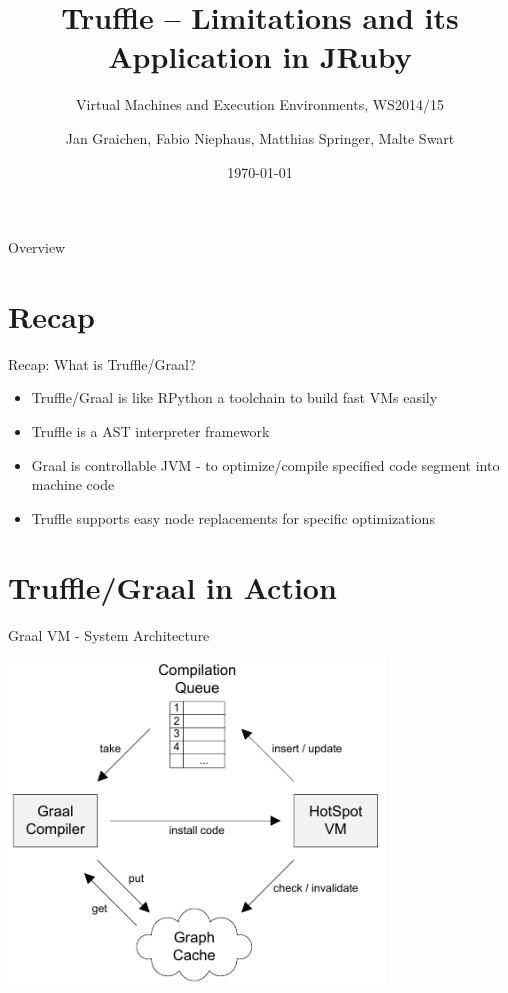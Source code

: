\documentclass[xcolor=dvipsname,handout]{beamer} %
\title{Truffle -- Limitations and its Application in JRuby}
\subtitle{Virtual Machines and Execution Environments, WS2014/15}
\author{Jan Graichen, Fabio Niephaus, Matthias Springer, Malte Swart}
\date{\today}
\institute[2012]{Hasso Plattner Institute, Software Architecture Group}
\begin{document}
\begin{frame}[plain]
	\maketitle
\end{frame}
\begin{frame}{Overview}
	\tableofcontents[hideallsubsections]
\end{frame}


\section{Recap}

\begin{frame}{Recap: What is Truffle/Graal?}
\begin{itemize}
    \item Truffle/Graal is like RPython a toolchain to build fast VMs easily
    \item Truffle is a AST interpreter framework
    \item Graal is controllable JVM - to optimize/compile specified code segment into machine code
    \item Truffle supports easy node replacements for specific optimizations
\end{itemize}
\end{frame}


\section{Truffle/Graal in Action}

\begin{frame}{Graal VM - System Architecture}
\begin{table}
    \centering
    \includegraphics[width=0.75\textwidth]{graal_architecture.pdf}
\end{table}
\end{frame}
\end{document}

